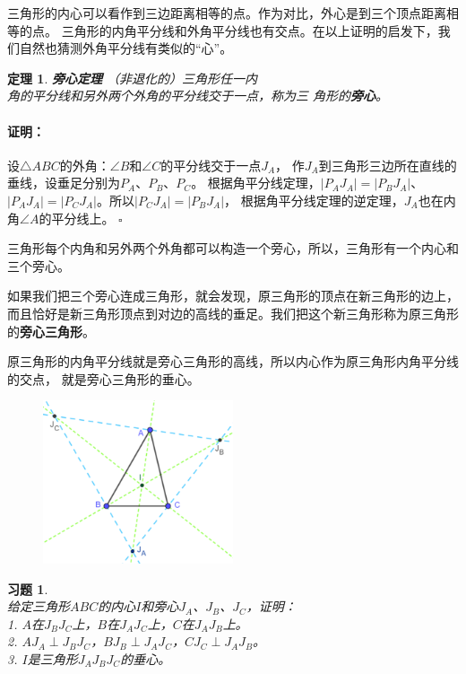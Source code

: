 \documentclass[12pt,UTF8]{ctexbook}
\newtheorem{tm}{定理}[section]
\newenvironment{proof2}{\paragraph{\textbf{证明：}}}{\hfill$\square$}
\newtheorem{xt}{习题}[section]
\begin{document}
三角形的内心可以看作到三边距离相等的点。作为对比，外心是到三个顶点距离相等的点。
三角形的内角平分线和外角平分线也有交点。在以上证明的启发下，我们自然也猜测外角平分线有类似的“心”。

\begin{tm}{\textbf{旁心定理 }}\label{tm:1-2-1}
    （非退化的）三角形任一内\\
    角的平分线和另外两个外角的平分线交于一点，称为三
    角形的\textbf{旁心}。
\end{tm}

\begin{proof2}
    设$\triangle ABC$的外角：$\angle B$和$\angle C$的平分线交于一点$J_A$，
    作$J_A$到三角形三边所在直线的垂线，设垂足分别为$P_A$、$P_B$、$P_C$。
    根据角平分线定理，$|P_AJ_A| = |P_BJ_A|$、$|P_AJ_A| = |P_CJ_A|$。所以$|P_CJ_A| = |P_BJ_A|$，
    根据角平分线定理的逆定理，$J_A$也在内角$\angle A$的平分线上。
\end{proof2}

三角形每个内角和另外两个外角都可以构造一个旁心，所以，三角形有一个内心和三个旁心。

如果我们把三个旁心连成三角形，就会发现，原三角形的顶点在新三角形的边上，
而且恰好是新三角形顶点到对边的高线的垂足。我们把这个新三角形称为原三角形的\textbf{旁心三角形}。

原三角形的内角平分线就是旁心三角形的高线，所以内心作为原三角形内角平分线的交点，
就是旁心三角形的垂心。

\begin{figure}[h] %
    \centering
    \vspace{10pt}
    \includegraphics[width=0.5\textwidth]{三角形内心旁心.png}
\end{figure}

\begin{xt}\label{xt:1-2-0}
    \mbox{}\\
    给定三角形$ABC$的内心$I$和旁心$J_A$、$J_B$、$J_C$，证明：\\
    1. $A$在$J_BJ_C$上，$B$在$J_AJ_C$上，$C$在$J_AJ_B$上。\\
    2. $AJ_A \perp J_BJ_C$，$BJ_B \perp J_AJ_C$，$CJ_C \perp J_AJ_B$。\\
    3. $I$是三角形$J_AJ_BJ_C$的垂心。
\end{xt}
\end{document}
